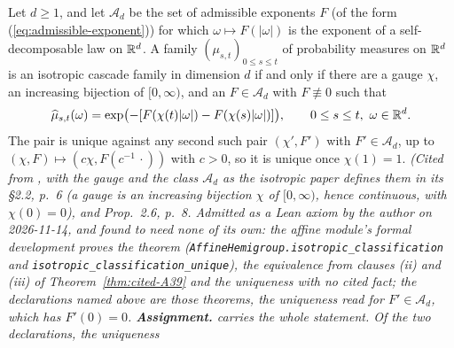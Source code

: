 \begin{theorem}
\label{thm:cited-A31}
\leanok
{}
Let $d \ge 1$, and let $\mathcal{A}_d$ be the set of admissible exponents $F$ (of the form
(\ref{eq:admissible-exponent})) for which $\omega \mapsto F(|\omega|)$ is the exponent of a
self-decomposable law on $\mathbb{R}^d$. A family $(\mu_{s,t})_{0 \le s \le t}$ of probability measures
on $\mathbb{R}^d$ is an isotropic cascade family in dimension $d$ if and only if there are a gauge
$\chi$, an increasing bijection of $[0,\infty)$, and an $F \in \mathcal{A}_d$ with
$F \not\equiv 0$ such that
\[
  \widehat\mu_{s,t}(\omega) = \exp\bigl(-[F(\chi(t)|\omega|) - F(\chi(s)|\omega|)]\bigr),
  \qquad 0 \le s \le t,\ \omega \in \mathbb{R}^d.
\]
The pair is unique against any second such pair $(\chi', F')$ with $F' \in \mathcal{A}_d$, up to
$(\chi, F) \mapsto (c\chi, F(c^{-1}\,\cdot))$ with $c > 0$, so it is unique once $\chi(1) = 1$.
\statusA\quad{}\quad\emph{(Cited from , with the gauge
and the class $\mathcal{A}_d$ as the isotropic paper defines them in its \S 2.2, p.~6 (a gauge is
an increasing bijection $\chi$ of $[0,\infty)$, hence continuous, with $\chi(0) = 0$), and
Prop.~2.6, p.~8. Admitted as a Lean axiom by the author on 2026-11-14, and found to need none of
its own: the affine module's formal development proves the theorem
(\texttt{AffineHemigroup.isotropic\_classification} and
\texttt{isotropic\_classification\_unique}), the equivalence from clauses (ii) and (iii) of
Theorem~\ref{thm:cited-A39} and the uniqueness with no cited fact; the declarations named above are those
theorems, the uniqueness read for $F' \in \mathcal{A}_d$, which has $F'(0) = 0$. \textbf{Assignment.}
 carries the whole statement. Of the two declarations, the uniqueness
}
\end{theorem}
